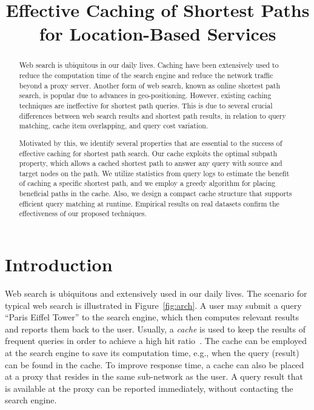 \documentclass{sig-alternate}
\begin{document}
\title{Effective Caching of Shortest Paths for Location-Based Services}



\maketitle

\begin{abstract}
%
Web search is ubiquitous in our daily lives.
Caching have been extensively used to reduce the computation time of the search engine
and reduce the network traffic beyond a proxy server.
Another form of web search, known as online shortest path search, is popular due
to advances in geo-positioning.
However, existing caching techniques are ineffective for shortest path queries.
This is due to several crucial differences
between web search results and shortest path results, in relation to query matching,
cache item overlapping, and query cost variation.

Motivated by this, we identify several properties that are essential to the success of effective
caching for shortest path search.
Our cache exploits the optimal subpath property, which allows a cached shortest path to answer
any query with source and target nodes on the path.
We utilize statistics from query logs to estimate the benefit of caching a specific shortest path,
and we employ a greedy algorithm for placing beneficial paths in the cache.
Also, we design a compact cache structure that supports efficient query matching at runtime.
Empirical results on real datasets confirm the effectiveness of our proposed techniques.
\end{abstract}





\section{Introduction} \label{sec:intro}
%
Web search is ubiquitous and extensively used in our daily lives.
The scenario for typical web search is illustrated in Figure~\ref{fig:arch}.
A user may submit a query ``Paris Eiffel Tower'' to the search engine,
which then computes relevant results and reports them back to the user.
Usually, a {\em cache} is used to keep the results of frequent queries
in order to achieve a high hit ratio~\cite{BaezaYates07,OzcanAU08,AltingovdeOU09,Ozcan2011}.
The cache can be employed at the search engine to save its computation time,
e.g., when the query (result) can be found in the cache.
%
To improve response time, a cache can also be placed at a proxy that
resides in the same sub-network as the user.
A query result that is available at the proxy can be reported immediately, without contacting the search engine.
\end{document}
